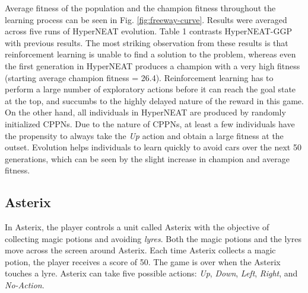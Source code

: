 \documentclass{acm_proc_article-sp}
\begin{document}
Average fitness of the population and the champion fitness throughout the learning process can be seen in Fig. \ref{fig:freeway-curve}. Results were averaged across five runs of HyperNEAT evolution. Table 1 contrasts HyperNEAT-GGP with previous results. The most striking observation from these results is that reinforcement learning is unable to find a solution to the problem, whereas even the first generation in HyperNEAT produces a champion with a very high fitness (starting average champion fitness = 26.4). Reinforcement learning has to perform a large number of exploratory actions before it can reach the goal state at the top, and succumbs to the highly delayed nature of the reward in this game. On the other hand, all individuals in HyperNEAT are produced by randomly initialized CPPNs. Due to the nature of CPPNs, at least a few individuals have the propensity to always take the \textit{Up} action and obtain a large fitness at the outset. Evolution helps individuals to learn quickly to avoid cars over the next 50 generations, which can be seen by the slight increase in champion and average fitness.

\subsection {Asterix}
In Asterix, the player controls a unit called Asterix with the objective of collecting magic potions and avoiding \textit{lyres}. Both the magic potions and the lyres move across the screen around Asterix. Each time Asterix collects a magic potion, the player receives a score of 50. The game is over when the Asterix touches a lyre. Asterix can take five possible actions: \textit{Up}, \textit{Down}, \textit{Left}, \textit{Right}, and \textit{No-Action}.
\end{document}
